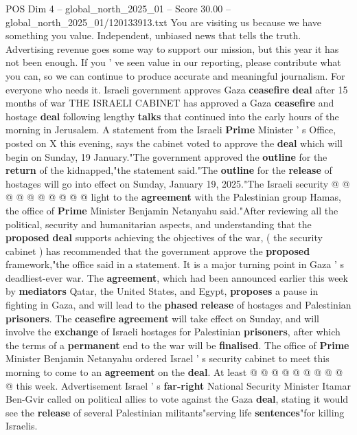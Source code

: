 \begin{textsample}{POS Dim 4 – global\_north\_2025\_01 – Score 30.00 – global\_north\_2025\_01/120133913.txt}  \label{ex:f4_pos_042}
You are visiting us because we have something you value.
Independent, unbiased news that tells the truth.
Advertising revenue goes some way to support our mission, but this year it has not been enough.
If you ' ve seen value in our reporting, please contribute what you can, so we can continue to produce accurate and meaningful journalism.
For everyone who needs it.
Israeli government approves Gaza \textbf{ceasefire} \textbf{deal} after 15 months of war THE ISRAELI CABINET has approved a Gaza \textbf{ceasefire} and hostage \textbf{deal} following lengthy \textbf{talks} that continued into the early hours of the morning in Jerusalem.
A statement from the Israeli \textbf{Prime} Minister ' s Office, posted on X this evening, says the cabinet voted to approve the \textbf{deal} which will begin on Sunday, 19 January."The government approved the \textbf{outline} for the \textbf{return} of the kidnapped,"the statement said."The \textbf{outline} for the \textbf{release} of hostages will go into effect on Sunday, January 19, 2025."The Israeli security @ @ @ @ @ @ @ @ @ @ light to the \textbf{agreement} with the Palestinian group Hamas, the office of \textbf{Prime} Minister Benjamin Netanyahu said."After reviewing all the political, security and humanitarian aspects, and understanding that the \textbf{proposed} \textbf{deal} supports achieving the objectives of the war, ( the security cabinet ) has recommended that the government approve the \textbf{proposed} framework,"the office said in a statement.
It is a major turning point in Gaza ' s deadliest-ever war.
The \textbf{agreement}, which had been announced earlier this week by \textbf{mediators} Qatar, the United States, and Egypt, \textbf{proposes} a pause in fighting in Gaza, and will lead to the \textbf{phased} \textbf{release} of hostages and Palestinian \textbf{prisoners}.
The \textbf{ceasefire} \textbf{agreement} will take effect on Sunday, and will involve the \textbf{exchange} of Israeli hostages for Palestinian \textbf{prisoners}, after which the terms of a \textbf{permanent} end to the war will be \textbf{finalised}.
The office of \textbf{Prime} Minister Benjamin Netanyahu ordered Israel ' s security cabinet to meet this morning to come to an \textbf{agreement} on the \textbf{deal}.
At least @ @ @ @ @ @ @ @ @ @ this week.
Advertisement Israel ' s \textbf{far-right} National Security Minister Itamar Ben-Gvir called on political allies to vote against the Gaza \textbf{deal}, stating it would see the \textbf{release} of several Palestinian militants"serving life \textbf{sentences}"for killing Israelis.

\end{textsample}
